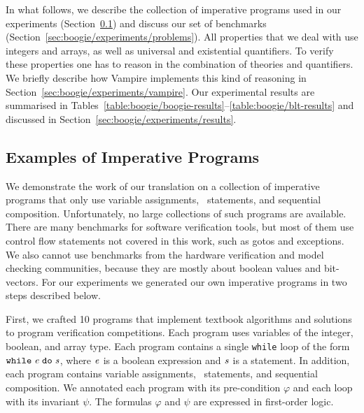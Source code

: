 In what follows, we describe the collection of imperative programs used in our experiments (Section~\ref{sec:boogie/experiments/programs}) and discuss our set of benchmarks (Section~\ref{sec:boogie/experiments/problems}). All properties that we deal with use integers and arrays, as well as universal and existential quantifiers. To verify these properties one has to reason in the combination of theories and quantifiers. We briefly describe how Vampire implements this kind of reasoning in Section~\ref{sec:boogie/experiments/vampire}. Our experimental results are summarised in Tables~\ref{table:boogie/boogie-results}--\ref{table:boogie/blt-results} and discussed in Section~\ref{sec:boogie/experiments/results}.

\newcommand{\bad}{\mathit{bad}}
\newcommand{\iter}{i}

\subsection{Examples of Imperative Programs}\label{sec:boogie/experiments/programs}
We demonstrate the work of our translation on a collection of imperative programs that only use variable assignments, \ITE\ statements, and sequential composition. Unfortunately, no large collections of such programs are available. There are many benchmarks for software verification tools, but most of them use control flow statements not covered in this work, such as gotos and exceptions. We also cannot use benchmarks from the hardware verification and model checking communities, because they are mostly about boolean values and bit-vectors. For our experiments we generated our own imperative programs in two steps described below.

First, we crafted 10 programs that implement textbook algorithms and solutions to program verification competitions. Each program uses variables of the integer, boolean, and array type. Each program contains a single \verb'while' loop
of the form $\mathtt{while}\;{\mathit{e}}\;\mathtt{do}\;{\mathit{s}}$, where $\mathit{e}$ is a boolean expression and $\mathit{s}$ is a statement. In addition, each program contains 
variable assignments, \ITE\ statements, and sequential composition. We annotated each program with its pre-condition $\varphi$ and each loop with its invariant $\psi$. The formulas $\varphi$ and $\psi$ are expressed in first-order logic.


